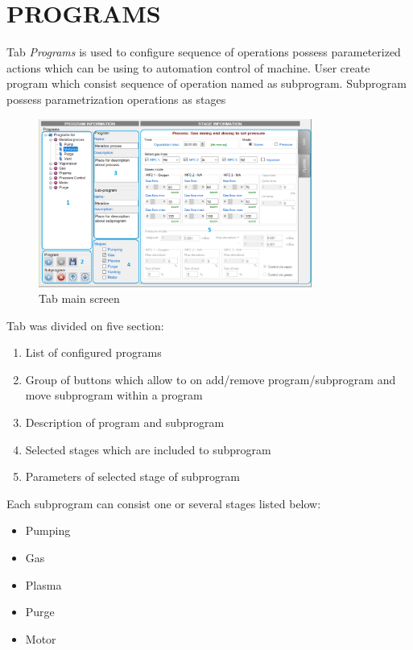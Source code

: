 \section {PROGRAMS}

Tab \textit{Programs} is used to configure sequence of operations possess parameterized actions which can be using to automation control of machine. User create program which consist sequence of operation named as subprogram. Subprogram possess parametrization operations as stages

	\begin{figure}[!h] 
	\centering \includegraphics[width=0.8\textwidth]{Graphic/Programs/ProgramsTab.png}	
	\caption{Tab main screen}
	\label{tab_main_screen}
	\end{figure}
	\FloatBarrier

Tab was divided  on five section:

\begin{enumerate}
	\item List of  configured  programs 
	\item Group of buttons which allow to on add/remove program/subprogram and move subprogram within a program
	\item Description of program and subprogram
	\item Selected stages which are included to subprogram
	\item Parameters of selected stage of subprogram
\end{enumerate}

Each subprogram can consist one or several stages listed below:
\begin{itemize}
	\item Pumping
	\item Gas
	\item Plasma
	\item Purge
	\item Motor
\end{itemize}

